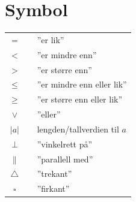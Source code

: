 



\section*{Symbol} \label{Symbol}
\renewcommand{\arraystretch}{1.2}
\begin{tabular}{@{}cp{0.4cm}l}
$ = $ && ''er lik'' \\
$ < $ && ''er mindre enn'' \\
$ > $ && ''er større enn'' \\
$ \leq $ && ''er mindre enn eller lik'' \\
$ \geq $ && ''er større enn eller lik'' \\		
$ \vee $&&''eller''\\
$|a| $ &&  lengden/tallverdien til $ a $\\
$\perp $ &&  ''vinkelrett på'' \\
$\parallel $ &&  ''parallell med'' \\
$\triangle $ &&  ''trekant'' \\
$\square $ &&  ''firkant''\\
\end{tabular}
\renewcommand{\arraystretch}{1}

